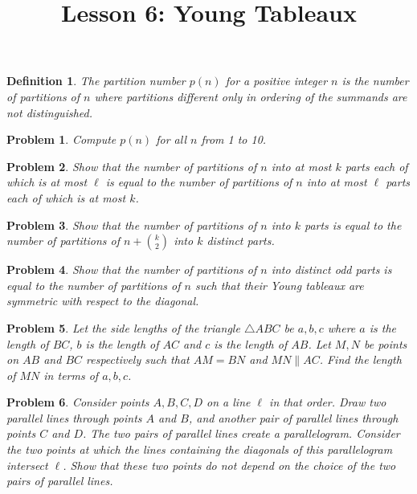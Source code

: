 \documentclass[a4paper,12pt]{article}
\title{Lesson 6: Young Tableaux}
\theoremstyle{perfect}
\newtheorem{dfn}{Definition}
\newtheorem{prb}{Problem}
\begin{document}
 
\maketitle
\setlength{\parindent}{0cm}

\begin{dfn}
The \textit{partition number} $p(n)$ for a positive integer $n$ is the number of partitions of $n$ where partitions different only in ordering of the summands are not distinguished. 
\end{dfn}

\begin{prb}
Compute $p(n)$ for all $n$ from 1 to 10.
\end{prb}

\begin{prb}
Show that the number of partitions of $n$ into at most $k$ parts each of which is at most $\ell$ is equal to the number of partitions of $n$ into at most $\ell$ parts each of which is at most $k$.
\end{prb}

\begin{prb}
Show that the number of partitions of $n$ into $k$ parts is equal to the number of partitions of $n+{k \choose 2}$ into $k$ \textit{distinct} parts.
\end{prb}

\begin{prb}
Show that the number of partitions of $n$ into distinct odd parts is equal to the number of partitions of $n$ such that their Young tableaux are symmetric with respect to the diagonal.
\end{prb}

\begin{prb}
Let the side lengths of the triangle $\triangle ABC$ be $a,b,c$ where $a$ is the length of  $BC$, $b$ is the length of $AC$ and $c$ is the length of $AB$. Let $M, N$ be points on $AB$ and $BC$ respectively such that $AM = BN$ and $MN \parallel AC$. Find the length of $MN$ in terms of $a,b,c$.
\end{prb}

\begin{prb}
Consider points $A, B, C, D$ on a line $\ell$ in that order. Draw two parallel lines through points $A$ and $B$, and another pair of parallel lines through points $C$ and $D$. The two pairs of parallel lines create a parallelogram. Consider the two points at which the lines containing the diagonals of this parallelogram intersect $\ell$. Show that these two points do not depend on the choice of the two pairs of parallel lines. 
\end{prb}
\end{document}
